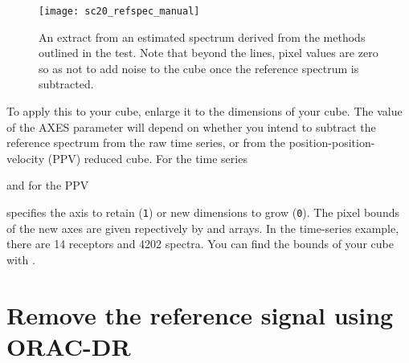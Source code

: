 \documentclass[11pt,oneside,chapters]{starlink}
\begin{document}
\begin{terminalv}
\end{terminalv}

\begin{figure}[h!]
\begin{center}
\texttt{[image: sc20\_refspec\_manual]}
\caption[An estimated reference spectrum]{\label{fig::estimated_refspec}
  An extract from an estimated spectrum derived from the methods outlined
  in the test. Note that beyond the lines, pixel values are zero so as
  not to add noise to the cube once the reference spectrum is subtracted.}
\end{center}
\end{figure}

To apply this to your cube, enlarge it to the dimensions of your cube.
The value of the AXES parameter will depend on whether you intend to
subtract the reference spectrum from the raw time series, or from the
position-position-velocity (PPV) reduced cube.  For the time series

\begin{terminalv}
\end{terminalv}

and for the PPV
\begin{terminalv}
\end{terminalv}

 specifies the axis to retain (\texttt{1}) or new
dimensions to grow (\texttt{0}).  The pixel bounds of the new axes are
given repectively by  and  arrays.  In the
time-series example, there are 14 receptors and 4202 spectra.  You can
find the bounds of your cube with \ndftrace.

\begin{terminalv}
\end{terminalv}


\section{Remove the reference signal using ORAC-DR}
\end{document}
